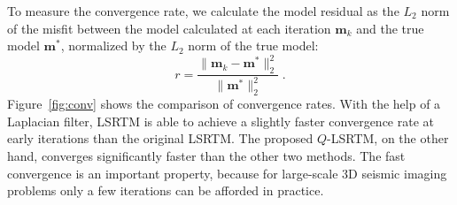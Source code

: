 
To measure the convergence rate, we calculate the model residual as the $L_2$ norm of the misfit between the model calculated at each iteration $\mathbf{m}_k$ and the true model $\mathbf{m}^*$, normalized by the $L_2$ norm of the true model:
\begin{equation}
  \label{eq:res}
  r = \frac{\|\mathbf{m}_k - \mathbf{m}^* \|^2_2}{\|\mathbf{m}^*\|^2_2} \; .
\end{equation}
Figure~\ref{fig:conv} shows the comparison of convergence rates. With the help of a Laplacian filter, LSRTM is able to achieve a slightly faster convergence rate at early iterations than the original LSRTM. The proposed $Q$-LSRTM, on the other hand, converges significantly faster than the other two methods.  The fast convergence is an important property, because for large-scale 3D seismic imaging problems only a few iterations can be afforded in practice.

